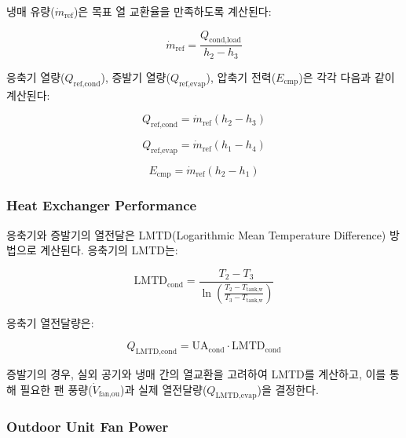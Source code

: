 \documentclass[final,5p,times,twocolumn,authoryear]{elsarticle}
\begin{document}
냉매 유량($\dot{m}_{\text{ref}}$)은 목표 열 교환율을 만족하도록 계산된다:

\begin{equation}
\label{eq:hpb_refrigerant_flow}
\dot{m}_{\text{ref}} = \frac{Q_{\text{cond,load}}}{h_2 - h_3}
\end{equation}

응축기 열량($Q_{\text{ref,cond}}$), 증발기 열량($Q_{\text{ref,evap}}$), 압축기 전력($E_{\text{cmp}}$)은 각각 다음과 같이 계산된다:

\begin{equation}
\label{eq:hpb_q_ref_cond}
Q_{\text{ref,cond}} = \dot{m}_{\text{ref}} (h_2 - h_3)
\end{equation}

\begin{equation}
\label{eq:hpb_q_ref_evap}
Q_{\text{ref,evap}} = \dot{m}_{\text{ref}} (h_1 - h_4)
\end{equation}

\begin{equation}
\label{eq:hpb_e_cmp}
E_{\text{cmp}} = \dot{m}_{\text{ref}} (h_2 - h_1)
\end{equation}

\subsubsection{Heat Exchanger Performance}

응축기와 증발기의 열전달은 LMTD(Logarithmic Mean Temperature Difference) 방법으로 계산된다. 응축기의 LMTD는:

\begin{equation}
\label{eq:hpb_lmtd_cond}
\text{LMTD}_{\text{cond}} = \frac{T_2 - T_3}{\ln\left(\frac{T_2 - T_{\text{tank,w}}}{T_3 - T_{\text{tank,w}}}\right)}
\end{equation}

응축기 열전달량은:

\begin{equation}
\label{eq:hpb_q_lmtd_cond}
Q_{\text{LMTD,cond}} = \text{UA}_{\text{cond}} \cdot \text{LMTD}_{\text{cond}}
\end{equation}

증발기의 경우, 실외 공기와 냉매 간의 열교환을 고려하여 LMTD를 계산하고, 이를 통해 필요한 팬 풍량($\dot{V}_{\text{fan,ou}}$)과 실제 열전달량($Q_{\text{LMTD,evap}}$)을 결정한다.

\subsubsection{Outdoor Unit Fan Power}
\end{document}

